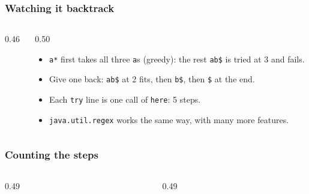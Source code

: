 \documentclass[aspectratio=169,10pt,compress]{beamer}
\begin{document}
\begin{frame}[t,fragile] \frametitle{Watching it backtrack}
  \begin{columns}[T]
    \begin{column}{0.46\textwidth}
    \end{column}
    \begin{column}{0.50\textwidth}
      \begin{itemize}\small
        \item \texttt{a*} first takes all three \texttt{a}s (greedy): the rest \texttt{ab\$} is tried at 3 and fails.
        \item Give one back: \texttt{ab\$} at 2 fits, then \texttt{b\$}, then \texttt{\$} at the end.
        \item Each \texttt{try} line is one call of \texttt{here}: 5 steps.
        \item \texttt{java.util.regex} works the same way, with many more features.
      \end{itemize}
    \end{column}
  \end{columns}
\end{frame}




\begin{frame}[t,fragile] \frametitle{Counting the steps}
  \begin{columns}[T]
    \begin{column}{0.49\textwidth}
    \end{column}
    \begin{column}{0.49\textwidth}
    \end{column}
  \end{columns}
\end{frame}
\end{document}
